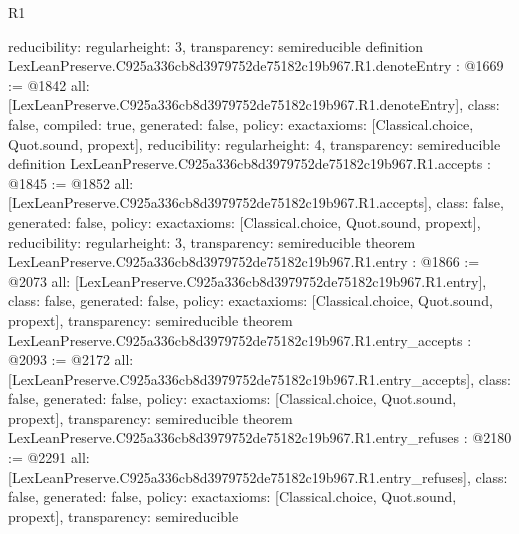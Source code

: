 \begin{lexlean}{R1}
\begin{coremodule}
{  reducibility: regular{height: 3},
  transparency: semireducible
}
definition LexLeanPreserve.C925a336cb8d3979752de75182c19b967.R1.denoteEntry : @1669 := @1842 {
  all: [LexLeanPreserve.C925a336cb8d3979752de75182c19b967.R1.denoteEntry],
  class: false,
  compiled: true,
  generated: false,
  policy: exact{axioms: [Classical.choice, Quot.sound, propext]},
  reducibility: regular{height: 4},
  transparency: semireducible
}
definition LexLeanPreserve.C925a336cb8d3979752de75182c19b967.R1.accepts : @1845 := @1852 {
  all: [LexLeanPreserve.C925a336cb8d3979752de75182c19b967.R1.accepts],
  class: false,
  generated: false,
  policy: exact{axioms: [Classical.choice, Quot.sound, propext]},
  reducibility: regular{height: 3},
  transparency: semireducible
}
theorem LexLeanPreserve.C925a336cb8d3979752de75182c19b967.R1.entry : @1866 := @2073 {
  all: [LexLeanPreserve.C925a336cb8d3979752de75182c19b967.R1.entry],
  class: false,
  generated: false,
  policy: exact{axioms: [Classical.choice, Quot.sound, propext]},
  transparency: semireducible
}
theorem LexLeanPreserve.C925a336cb8d3979752de75182c19b967.R1.entry_accepts : @2093 := @2172 {
  all: [LexLeanPreserve.C925a336cb8d3979752de75182c19b967.R1.entry_accepts],
  class: false,
  generated: false,
  policy: exact{axioms: [Classical.choice, Quot.sound, propext]},
  transparency: semireducible
}
theorem LexLeanPreserve.C925a336cb8d3979752de75182c19b967.R1.entry_refuses : @2180 := @2291 {
  all: [LexLeanPreserve.C925a336cb8d3979752de75182c19b967.R1.entry_refuses],
  class: false,
  generated: false,
  policy: exact{axioms: [Classical.choice, Quot.sound, propext]},
  transparency: semireducible
}


\end{coremodule}
\end{lexlean}
